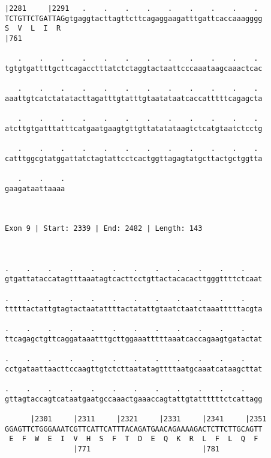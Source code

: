 \documentclass{article}
\begin{document}
\begin{Verbatim}
|2281     |2291   .    .    .    .    .    .    .    .    . 
TCTGTTCTGATTAGgtgaggtacttagttcttcagaggaagatttgattcaccaaagggg
S  V  L  I  R                                               
|761                                                        
  
   .    .    .    .    .    .    .    .    .    .    .    . 
tgtgtgattttgcttcagacctttatctctaggtactaattcccaaataagcaaactcac
                                                            
   .    .    .    .    .    .    .    .    .    .    .    . 
aaattgtcatctatatacttagatttgtatttgtaatataatcaccatttttcagagcta
                                                            
   .    .    .    .    .    .    .    .    .    .    .    . 
atcttgtgatttatttcatgaatgaagtgttgttatatataagtctcatgtaatctcctg
                                                            
   .    .    .    .    .    .    .    .    .    .    .    . 
catttggcgtatggattatctagtattcctcactggttagagtatgcttactgctggtta
                                                            
   .    .    .
gaagataattaaaa
              
              
 
Exon 9 | Start: 2339 | End: 2482 | Length: 143



.    .    .    .    .    .    .    .    .    .    .    .    
gtgattataccatagtttaaatagtcacttcctgttactacacacttgggttttctcaat
                                                            
.    .    .    .    .    .    .    .    .    .    .    .    
tttttactattgtagtactaatattttactatattgtaatctaatctaaatttttacgta
                                                            
.    .    .    .    .    .    .    .    .    .    .    .    
ttcagagctgttcaggataaatttgcttggaaatttttaaatcaccagaagtgatactat
                                                            
.    .    .    .    .    .    .    .    .    .    .    .    
cctgataattaacttccaagttgtctcttaatatagttttaatgcaaatcataagcttat
                                                            
.    .    .    .    .    .    .    .    .    .    .    .    
gttagtaccagtcataatgaatgccaaactgaaaccagtattgtattttttctcattagg
                                                            
      |2301     |2311     |2321     |2331     |2341     |2351
GGAGTTCTGGGAAATCGTTCATTCATTTACAGATGAACAGAAAAGACTCTTCTTGCAGTT
 E  F  W  E  I  V  H  S  F  T  D  E  Q  K  R  L  F  L  Q  F 
                |771                          |781          
  

\end{Verbatim}
\end{document}
